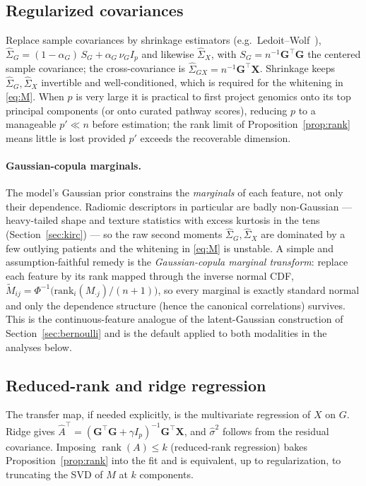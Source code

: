 \documentclass{article}
\newcommand{\rank}{\operatorname{rank}}
\newcommand{\Sg}{\Sigma_{G}}
\newcommand{\Sx}{\Sigma_{X}}
\newcommand{\Sgx}{\Sigma_{GX}}
\newcommand{\T}{^{\top}}
\begin{document}
\subsection{Regularized covariances}
\label{sec:estimation-cov}
Replace sample covariances by shrinkage estimators (e.g.\ Ledoit--Wolf~\citep{ledoit2004shrinkage}),
$\hat\Sg = (1-\alpha_G)\,S_G + \alpha_G\, \nu_G I_p$ and likewise $\hat\Sx$, with
$S_G = n^{-1}\mathbf{G}\T\mathbf{G}$ the centered sample covariance; the
cross-covariance is $\hat\Sgx = n^{-1}\mathbf{G}\T\mathbf{X}$. Shrinkage keeps
$\hat\Sg, \hat\Sx$ invertible and well-conditioned, which is required for the
whitening in \eqref{eq:M}. When $p$ is very large it is practical to first
project genomics onto its top principal components (or onto curated pathway
scores), reducing $p$ to a manageable $p' \ll n$ before estimation; the rank
limit of Proposition~\ref{prop:rank} means little is lost provided $p'$ exceeds
the recoverable dimension.

\paragraph{Gaussian-copula marginals.}
The model's Gaussian prior constrains the \emph{marginals} of each feature, not
only their dependence. Radiomic descriptors in particular are badly
non-Gaussian --- heavy-tailed shape and texture statistics with excess kurtosis
in the tens (Section~\ref{sec:kirc}) --- so the raw second moments
$\hat\Sg,\hat\Sx$ are dominated by a few outlying patients and the whitening in
\eqref{eq:M} is unstable. A simple and assumption-faithful remedy is the
\emph{Gaussian-copula marginal transform}: replace each feature by its
rank mapped through the inverse normal CDF,
$\tilde M_{ij} = \Phi^{-1}\!\big(\mathrm{rank}_i(M_{\cdot j})/(n+1)\big)$, so
every marginal is exactly standard normal and only the dependence structure
(hence the canonical correlations) survives. This is the continuous-feature
analogue of the latent-Gaussian construction of Section~\ref{sec:bernoulli}
and is the default applied to both modalities in the analyses below.

\subsection{Reduced-rank and ridge regression}
\label{sec:estimation-rrr}
The transfer map, if needed explicitly, is the multivariate regression of $X$ on
$G$. Ridge gives
$\hat A\T = (\mathbf{G}\T\mathbf{G} + \gamma I_p)^{-1}\mathbf{G}\T\mathbf{X}$,
and $\hat\sigma^2$ follows from the residual covariance. Imposing
$\rank(A) \le k$ (reduced-rank regression) bakes Proposition~\ref{prop:rank}
into the fit and is equivalent, up to regularization, to truncating the SVD of
$M$ at $k$ components.
\end{document}
